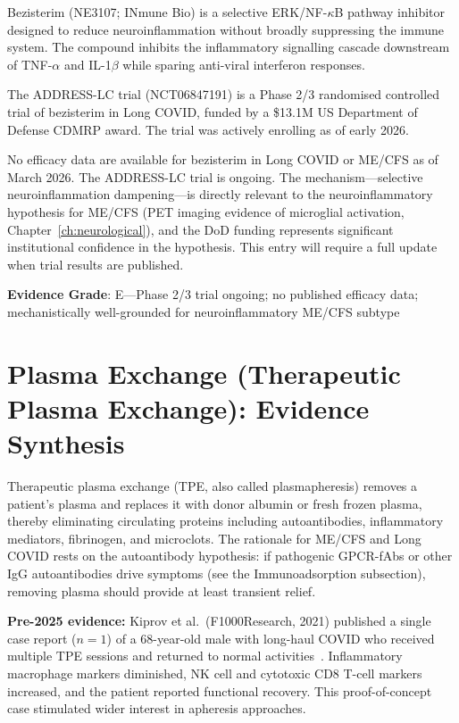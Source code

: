 Bezisterim (NE3107; INmune Bio) is a selective ERK/NF-$\kappa$B pathway inhibitor designed to reduce neuroinflammation without broadly suppressing the immune system. The compound inhibits the inflammatory signalling cascade downstream of TNF-$\alpha$ and IL-1$\beta$ while sparing anti-viral interferon responses.

The ADDRESS-LC trial (NCT06847191) is a Phase 2/3 randomised controlled trial of bezisterim in Long COVID, funded by a \$13.1M US Department of Defense CDMRP award. The trial was actively enrolling as of early 2026.

\begin{limitation}
No efficacy data are available for bezisterim in Long COVID or ME/CFS as of March 2026. The ADDRESS-LC trial is ongoing. The mechanism---selective neuroinflammation dampening---is directly relevant to the neuroinflammatory hypothesis for ME/CFS (PET imaging evidence of microglial activation, Chapter~\ref{ch:neurological}), and the DoD funding represents significant institutional confidence in the hypothesis. This entry will require a full update when trial results are published.
\end{limitation}

\textbf{Evidence Grade}: E---Phase 2/3 trial ongoing; no published efficacy data; mechanistically well-grounded for neuroinflammatory ME/CFS subtype

\section{Plasma Exchange (Therapeutic Plasma Exchange): Evidence Synthesis}
\label{sec:plasma-exchange-standalone}

Therapeutic plasma exchange (TPE, also called plasmapheresis) removes a patient's plasma and replaces it with donor albumin or fresh frozen plasma, thereby eliminating circulating proteins including autoantibodies, inflammatory mediators, fibrinogen, and microclots. The rationale for ME/CFS and Long COVID rests on the autoantibody hypothesis: if pathogenic GPCR-fAbs or other IgG autoantibodies drive symptoms (see the Immunoadsorption subsection), removing plasma should provide at least transient relief.

\textbf{Pre-2025 evidence:} Kiprov et al.\ (F1000Research, 2021) published a single case report ($n=1$) of a 68-year-old male with long-haul COVID who received multiple TPE sessions and returned to normal activities~\cite{Kiprov2021plasmapheresis}. Inflammatory macrophage markers diminished, NK cell and cytotoxic CD8 T-cell markers increased, and the patient reported functional recovery. This proof-of-concept case stimulated wider interest in apheresis approaches.

